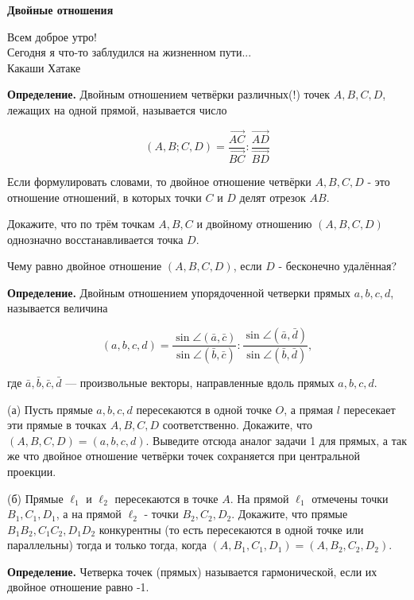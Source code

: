 \centerline{\bf \Huge Двойные отношения}

\begin{flushright}
        \scriptsize{Всем доброе утро!\\ Сегодня я что-то заблудился на жизненном пути...\\ Какаши Хатаке}
\end{flushright}

\textbf{Определение.} Двойным отношением четвёрки различных(!) точек $A, B, C, D$, лежащих на одной прямой, называется число

$$
(A, B ; C, D)=\frac{\overrightarrow{A C}}{\overrightarrow{B C}}: \frac{\overrightarrow{A D}}{\overrightarrow{B D}}
$$


Если формулировать словами, то двойное отношение четвёрки $A, B, C, D$ - это отношение отношений, в которых точки $C$ и $D$ делят отрезок $A B$.

Докажите, что по трём точкам $A, B, C$ и двойному отношению $(A, B, C, D)$ однозначно восстанавливается точка $D$.

Чему равно двойное отношение $(A, B, C, D)$, если $D$ - бесконечно удалённая?

\textbf{Определение.} Двойным отношением упорядоченной четверки прямых $a, b, c, d$, называется величина

$$
(a, b, c, d)=\frac{\sin \angle(\bar{a}, \bar{c})}{\sin \angle(\bar{b}, \bar{c})}: \frac{\sin \angle(\bar{a}, \bar{d})}{\sin \angle(\bar{b}, \bar{d})},
$$


где $\bar{a}, \bar{b}, \bar{c}, \bar{d}$ --- произвольные векторы, направленные вдоль прямых $a, b, c, d$.

(а) Пусть прямые $a, b, c, d$ пересекаются в одной точке $O$, а прямая $l$ пересекает эти прямые в точках $A, B, C, D$ соответственно. Докажите, что $(A, B, C, D)=(a, b, c, d)$. Выведите отсюда аналог задачи 1 для прямых, а так же что двойное отношение четвёрки точек сохраняется при центральной проекции.

\noindent(б) Прямые $\ell_1$ и $\ell_2$ пересекаются в точке $A$. На прямой $\ell_1$ отмечены точки $B_1, C_1, D_1$, а на прямой $\ell_2$ - точки $B_2, C_2, D_2$. Докажите, что прямые $B_1 B_2, C_1 C_2, D_1 D_2$ конкурентны (то есть пересекаются в одной точке или параллельны) тогда и только тогда, когда $\left(A, B_1, C_1, D_1\right)=\left(A, B_2, C_2, D_2\right)$.

\textbf{Определение.} Четверка точек (прямых) называется гармонической, если их двойное отношение равно -1.

